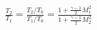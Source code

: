 \documentclass[10pt]{article}
\begin{document}
\begin{align*}\frac{T_2}{T_1}
=
\frac{T_2/T_0}{T_1/T_0}
=
\frac{
1 + \frac{\gamma-1}{2} M_1^{2}
}
{
1 + \frac{\gamma-1}{2} M_2^{2}
}
\end{align*}
\end{document}
